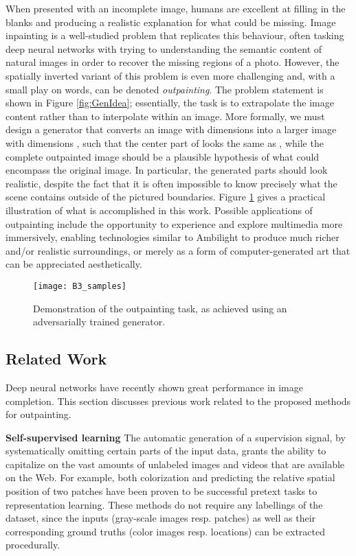 \documentclass[twocolumn,showpacs,nofootinbib,aps,superscriptaddress,eqsecnum,prd,notitlepage,showkeys,10pt]{revtex4-1}
\begin{document}
\hspace{\parindent} When presented with an incomplete image, humans are excellent at filling in the blanks and producing a realistic explanation for what could be missing. Image inpainting is a well-studied problem that replicates this behaviour, often tasking deep neural networks with trying to understanding the semantic content of natural images in order to recover the missing regions of a photo. However, the spatially inverted variant of this problem is even more challenging and, with a small play on words, can be denoted \textit{outpainting}. The problem statement is shown in Figure \ref{fig:GenIdea}; essentially, the task is to extrapolate the image content rather than to interpolate within an image. More formally, we must design a generator  that converts an image  with dimensions  into a larger image  with dimensions , such that the center part of  looks the same as , while the complete outpainted image  should be a plausible hypothesis of what could encompass the original image. In particular, the generated parts should look realistic, despite the fact that it is often impossible to know precisely what the scene contains outside of the pictured boundaries. Figure \ref{fig:B3_samples} gives a practical illustration of what is accomplished in this work. Possible applications
of outpainting include the opportunity to experience and explore multimedia more immersively, enabling technologies similar to Ambilight to produce much richer and/or realistic surroundings, or merely as a form of computer-generated art that can be appreciated aesthetically.

\begin{figure}[tp]
\centering
  \begin{adjustbox}{center}
  \texttt{[image: B3\_samples]}
  \end{adjustbox}
  \caption{Demonstration of the outpainting task, as achieved using an adversarially trained generator.}
  \label{fig:B3_samples}
\end{figure}

\subsection{Related Work}

Deep neural networks have recently shown great performance in image completion. This section discusses previous work related to the proposed methods for outpainting.

\textbf{Self-supervised learning} \hspace{0.3cm}
The automatic generation of a supervision signal, by systematically omitting certain parts of the input data, grants the ability to capitalize on the vast amounts of unlabeled images and videos that are available on the Web. For example, both colorization \cite{Larsson2017} and predicting the relative spatial position of two patches \cite{Doersch2015, Noroozi2016} have been proven to be successful pretext tasks to representation learning. These methods do not require any labellings of the dataset, since the inputs (gray-scale images resp. patches) as well as their corresponding ground truths (color images resp. locations) can be extracted procedurally.
\end{document}
